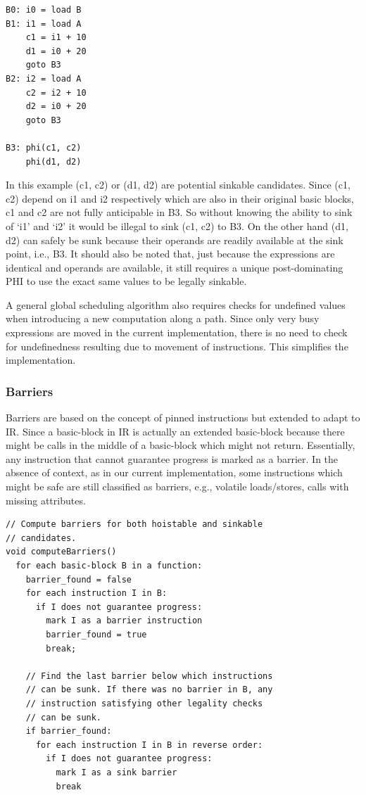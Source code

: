 \documentclass[sigplan,10pt,review,anonymous]{acmart}\settopmatter{printfolios=true,printccs=false,printacmref=false}
\begin{document}
\begin{verbatim}
B0: i0 = load B
B1: i1 = load A
    c1 = i1 + 10
    d1 = i0 + 20
    goto B3
B2: i2 = load A
    c2 = i2 + 10
    d2 = i0 + 20
    goto B3

B3: phi(c1, c2)
    phi(d1, d2)
\end{verbatim}

In this example (c1, c2) or (d1, d2) are potential sinkable candidates. Since
(c1, c2) depend on i1 and i2 respectively which are also in their original basic
blocks, c1 and c2 are not fully anticipable in B3. So without knowing the ability to sink
of `i1' and `i2' it would be illegal to sink (c1, c2) to B3. On the other hand
(d1, d2) can safely be sunk because their operands are readily available at the
sink point, i.e., B3. It should also be noted that, just because the expressions
are identical and operands are available, it still requires a unique
post-dominating PHI to use the exact same values to be legally sinkable.

A general global scheduling algorithm also requires checks for undefined values
when introducing a new computation along a path. Since only very busy
expressions are moved in the current implementation, there is no need to check
for undefinedness resulting due to movement of instructions. This simplifies the
implementation.

\subsubsection{Barriers}
Barriers are based on the concept of pinned instructions \cite{click1995global}
but extended to adapt to \LLVM{} IR. Since a basic-block in \LLVM{} IR is
actually an extended basic-block because there might be calls in the middle of a
basic-block which might not return. Essentially, any instruction that cannot
guarantee progress is marked as a barrier. In the absence of context, as in our
current implementation, some instructions which might be safe are still
classified as barriers, e.g., volatile loads/stores, calls with missing
attributes.

\begin{verbatim}
// Compute barriers for both hoistable and sinkable
// candidates.
void computeBarriers()
  for each basic-block B in a function:
    barrier_found = false
    for each instruction I in B:
      if I does not guarantee progress:
        mark I as a barrier instruction
        barrier_found = true
        break;

    // Find the last barrier below which instructions
    // can be sunk. If there was no barrier in B, any
    // instruction satisfying other legality checks
    // can be sunk.
    if barrier_found:
      for each instruction I in B in reverse order:
        if I does not guarantee progress:
          mark I as a sink barrier
          break
\end{verbatim}
\end{document}
